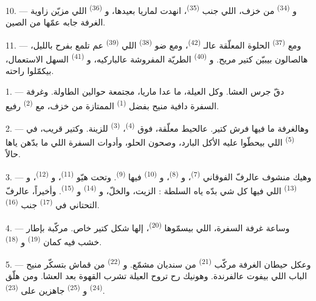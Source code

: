 10. --- و \textsuperscript{(34)} من خزف، اللي جنب
 \textsuperscript{(35)}، انهدت لماريا بعيدها،
و \textsuperscript{(36)} اللي مزيّن زاوية الغرفة جابه
عمّها من الصين.

11. --- ومع  \textsuperscript{(37)} الحلوة المعلّقة
عالـ \textsuperscript{(42)}، ومع ضو 
\textsuperscript{(38)} اللي 
\textsuperscript{(39)} عم تلمع بفرح بالليل، هالصالون بيبيّن كتير مريح.
و \textsuperscript{(40)} الطريّة المفروشة عالباركيه،
و \textsuperscript{(41)} السهل الاستعمال، بيكمّلوا
راحته.

\VUsaut{3.6mm}
\VUsaut{3.0mm}

1. --- دقّ جرس العشا. وكل العيلة، ما عدا ماريا، مجتمعة حوالين
الطاولة. وغرفة السفرة دافية منيح بفضل 
\textsuperscript{(1)} الممتازة من خزف، مع 
\textsuperscript{(2)} رفيع.

2. --- وهالغرفة ما فيها فرش كتير. عالحيط معلّقة، فوق 
\textsuperscript{(4)}،  \textsuperscript{(3)} للزينة. وكتير
قريب، في  \textsuperscript{(5)} اللي بيحطّوا عليه الأكل
البارد، وصحون الحلو، وأدوات السفرة اللي ما بدّهن ياها حالاً.

3. --- وهيك منشوف عالرفّ الفوقاني 
\textsuperscript{(7)}، و \textsuperscript{(8)}، و
\textsuperscript{(10)} فيها  \textsuperscript{(9)}. وتحت هيّو
 \textsuperscript{(11)}، و \textsuperscript{(12)}،
و \textsuperscript{(13)} اللي فيها كل شي بدّه ياه
السلطة : الزيت، والخلّ، و \textsuperscript{(14)}
و \textsuperscript{(15)}. وأخيراً، عالرفّ التحتاني في
 \textsuperscript{(17)} جنب 
\textsuperscript{(16)}.

4. --- وساعة غرفة السفرة، اللي بيسمّوها 
\textsuperscript{(20)}، إلها شكل كتير خاص. مركّبة بإطار خشب فيه كمان
 \textsuperscript{(19)} و
\textsuperscript{(18)}.

\VUsaut{4.6mm}
\VUsaut{3.0mm}

5. --- وعكل حيطان الغرفة مركّب  \textsuperscript{(21)}
من سنديان مشمّع. و \textsuperscript{(22)} من قماش
بتسكّر منيح الباب اللي بيفوت عالفرندة. وهونيك رح تروح العيلة تشرب
القهوة بعد العشا. ومن هلّق  \textsuperscript{(24)}
و \textsuperscript{(25)} جاهزين على
 \textsuperscript{(23)}.

